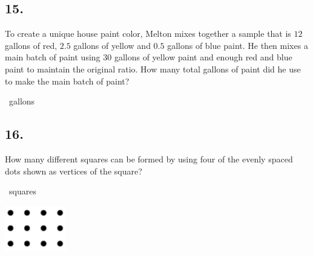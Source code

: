 \documentclass[12pt]{article}
\newenvironment{answer}{\vspace{1em}}{}
\newenvironment{answer}{\vspace{0em}\expandafter\comment}{\expandafter\endcomment}
\newlength{\currentparskip}
\newlength{\currentparindent}
\newenvironment{minipagex}[2][]
  {\setlength{\currentparskip}{\parskip}%
    \setlength{\currentparindent}{\parindent}%
   \begin{minipage}[#1]{#2}%
   \setlength{\parskip}{\currentparskip}%
   \setlength{\parindent}{\currentparindent}%
  }
  {\end{minipage}}
\begin{document}
\subsection*{15.}
To create a unique house paint color, Melton mixes together a sample that is $12$ gallons of red, $2.5$ gallons of yellow and $0.5$ gallons of blue paint. He then mixes a main batch of paint using $30$ gallons of yellow paint and enough red and blue paint to maintain the original ratio. How many total gallons of paint did he use to make the main batch of paint?

\fbox{\phantom{ANSWER}}~gallons

\begin{answer}
%
\end{answer}


\subsection*{16.}
How many different squares can be formed by using four of the evenly spaced dots shown as vertices of the square?

\fbox{\phantom{ANSWER}}~squares

\begin{minipagex}[b]{\linewidth}
\centering
\includegraphics[height=2cm]{sprint-16-figure}
\end{minipagex}
\end{document}
